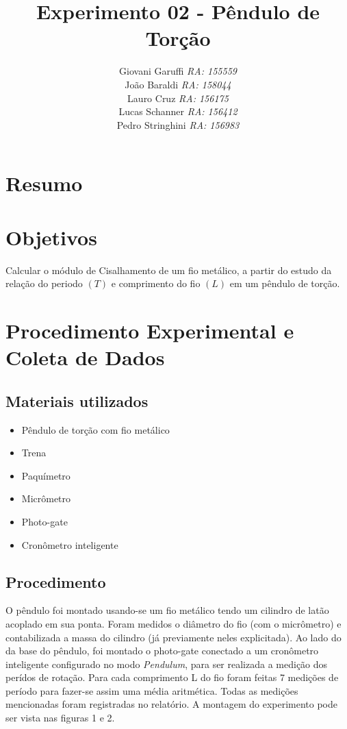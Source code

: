 \documentclass[12pt,a4paper]{article}
\begin{document}
\title{\vspace{70mm}\Huge Experimento 02 - Pêndulo de Torção}
\author{ Giovani Garuffi\qquad\hfill
		\textit {RA: 155559}\protect\\
		João Baraldi\hfill
		\textit{RA: 158044}\protect\\
		Lauro Cruz\hfill
		\textit{RA: 156175}\protect\\
		Lucas Schanner\hfill
		\textit{RA: 156412}\protect\\
		Pedro Stringhini\hfill
		\textit {RA: 156983}								
		}
\maketitle
\newpage
\section{Resumo}


\section{Objetivos}
Calcular o módulo de Cisalhamento de um fio metálico, a partir do estudo da relação do periodo $(T)$ e comprimento do fio $(L)$ em um pêndulo de torção.


\section{Procedimento Experimental e Coleta de Dados}

\subsection{Materiais utilizados}
\begin{itemize}
	\item Pêndulo de torção com fio metálico
	\item Trena
	\item Paquímetro
	\item Micrômetro
	\item Photo-gate
	\item Cronômetro inteligente
\end{itemize}

\subsection{Procedimento}
O pêndulo foi montado usando-se um fio metálico tendo um cilindro de latão acoplado em sua ponta. Foram medidos o diâmetro do fio (com o micrômetro) e contabilizada a massa do cilindro (já previamente neles explicitada). Ao lado do da base do pêndulo, foi montado o photo-gate conectado a um cronômetro inteligente configurado no modo \emph{Pendulum}, para ser realizada a medição dos perídos de rotação. Para cada comprimento L do fio foram feitas 7 medições de período para fazer-se assim uma média aritmética. Todas as medições mencionadas foram registradas no relatório.  A montagem do experimento pode ser vista nas figuras 1 e 2.
\end{document}
